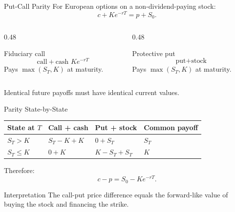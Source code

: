 \documentclass[aspectratio=169,11pt]{beamer}
\begin{document}
\begin{frame}{Put-Call Parity}
    For European options on a non-dividend-paying stock:
    \[
        c+Ke^{-rT}=p+S_0.
    \]

    \begin{columns}[T]
        \begin{column}{0.48\textwidth}
            \begin{block}{Fiduciary call}
                \[
                    \text{call}+\text{cash }Ke^{-rT}
                \]
                Pays \(\max(S_T,K)\) at maturity.
            \end{block}
        \end{column}
        \begin{column}{0.48\textwidth}
            \begin{block}{Protective put}
                \[
                    \text{put}+\text{stock}
                \]
                Pays \(\max(S_T,K)\) at maturity.
            \end{block}
        \end{column}
    \end{columns}

    \vspace{0.5em}
    Identical future payoffs must have identical current values.
\end{frame}

\begin{frame}{Parity State-by-State}
    \begin{center}
    \begin{tabular}{llll}
        \toprule
        State at \(T\) & Call + cash & Put + stock & Common payoff \\
        \midrule
        \(S_T>K\) & \(S_T-K+K\) & \(0+S_T\) & \(S_T\) \\
        \(S_T\leq K\) & \(0+K\) & \(K-S_T+S_T\) & \(K\) \\
        \bottomrule
    \end{tabular}
    \end{center}

    \vspace{0.8em}
    Therefore:
    \[
        c-p=S_0-Ke^{-rT}.
    \]

    \begin{alertblock}{Interpretation}
        The call-put price difference equals the forward-like value of buying the stock and financing the strike.
    \end{alertblock}
\end{frame}
\end{document}
